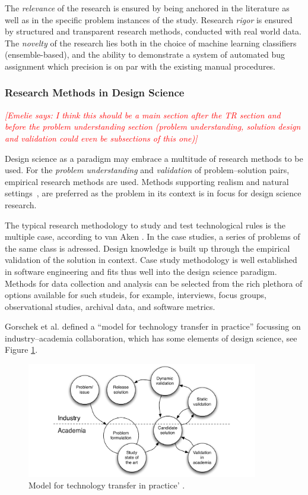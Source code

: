 \documentclass[graybox]{svmult}
\newcommand{\emelie}[1]{\textcolor{red}{{\it [Emelie says: #1]}}}
\newcommand{\emelie}[1]{}
\begin{document}
The \emph{relevance} of the research is ensured by being anchored in the literature as well as in the specific problem instances of the study. Research \emph{rigor} is ensured by structured and transparent research methods, conducted with real world data. The \emph{novelty} of the research lies both in the choice of machine learning classifiers (ensemble-based), and the ability to demonstrate a system of automated bug assignment which precision is on par with the existing manual procedures.

\subsubsection{Research Methods in Design Science} \emelie{I think this should be a main section after the TR section and before the problem understanding section (problem understanding, solution design and validation could even be subsections of this one)}

Design science as a paradigm may embrace a multitude of research methods to be used. For the \emph{problem understanding} and \emph{validation} of problem--solution pairs, empirical research methods are used. Methods supporting realism and natural settings~\cite{StolABC18}, are preferred as the problem in its context is in focus for design science research. 

The typical research methodology to study and test technological rules is the multiple case, according to van Aken \cite{van_aken_management_2004}. In the case studies, a series of problems of the same class is adressed. Design knowledge is built up through the empirical validation of the solution in context. Case study methodology is well established in software engineering \cite{Runeson12Case} and fits thus well into the design science paradigm. Methods for data collection and analysis can be selected from the rich plethora of options available for such studeis, for example, interviews, focus groups, observational studies, archival data, and software metrics.

Gorschek et al. defined a ``model for technology transfer in practice'' \cite{GorschekSW2006} focussing on industry--academia collaboration, which has some elements of design science, see Figure \ref{fig:GorschekModel}.

\begin{figure}
  \includegraphics[width=0.9\textwidth]{Figures/GorschekModel.pdf}
\caption{Model for technology transfer in practice' \cite{GorschekSW2006}.}
\label{fig:GorschekModel}       %
\end{figure}
\end{document}
